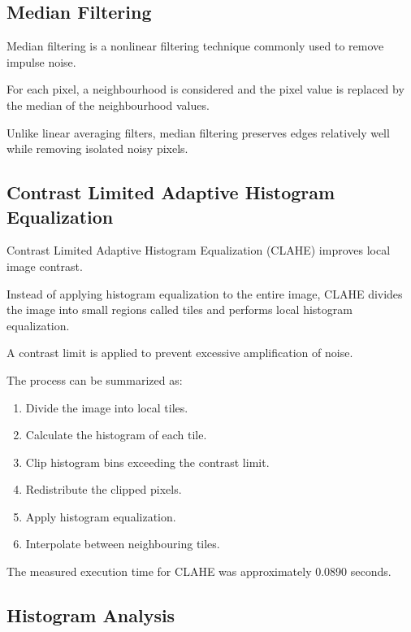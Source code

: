 \documentclass[11pt,a4paper]{article}
\begin{document}
\subsection{Median Filtering}

Median filtering is a nonlinear filtering technique commonly used to remove impulse noise.

For each pixel, a neighbourhood is considered and the pixel value is replaced by the median of the neighbourhood values.

Unlike linear averaging filters, median filtering preserves edges relatively well while removing isolated noisy pixels.


\subsection{Contrast Limited Adaptive Histogram Equalization}

Contrast Limited Adaptive Histogram Equalization (CLAHE) improves local image contrast.

Instead of applying histogram equalization to the entire image, CLAHE divides the image into small regions called tiles and performs local histogram equalization.

A contrast limit is applied to prevent excessive amplification of noise.

The process can be summarized as:

\begin{enumerate}
    \item Divide the image into local tiles.
    \item Calculate the histogram of each tile.
    \item Clip histogram bins exceeding the contrast limit.
    \item Redistribute the clipped pixels.
    \item Apply histogram equalization.
    \item Interpolate between neighbouring tiles.
\end{enumerate}

The measured execution time for CLAHE was approximately 0.0890 seconds.


\subsection{Histogram Analysis}
\end{document}
